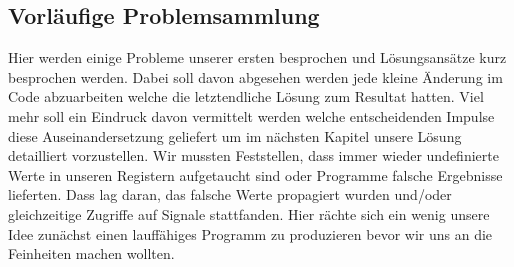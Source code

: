 \documentclass[paper=a4,fontsize=12pt,twocolumn]{scrreprt}
\begin{document}
\subsection{Vorläufige Problemsammlung}



Hier werden einige Probleme unserer ersten besprochen und Lösungsansätze kurz besprochen werden. Dabei soll davon abgesehen werden jede kleine Änderung im Code abzuarbeiten welche die letztendliche Lösung zum Resultat hatten. Viel mehr soll ein Eindruck davon vermittelt werden welche entscheidenden Impulse diese Auseinandersetzung geliefert um im nächsten Kapitel unsere Lösung detailliert vorzustellen.
Wir mussten Feststellen, dass immer wieder undefinierte Werte in unseren Registern aufgetaucht sind oder Programme falsche Ergebnisse lieferten.
    Dass lag daran, das falsche Werte propagiert wurden und/oder gleichzeitige Zugriffe auf Signale stattfanden.
    Hier rächte sich ein wenig unsere Idee zunächst einen lauffähiges Programm zu produzieren bevor wir uns an die Feinheiten machen wollten.
\end{document}
